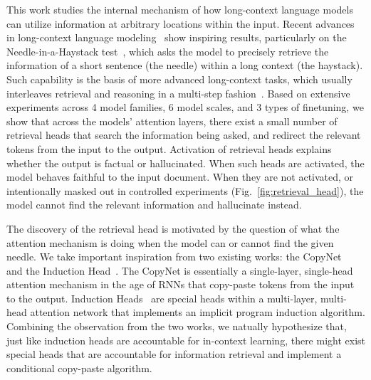 This work studies the internal mechanism of how long-context language models can utilize information at arbitrary locations within the input. 
Recent advances in long-context language modeling~\citep{claude, reid2024gemini, fu2024data} show inspiring results, particularly on the Needle-in-a-Haystack test~\citep{needleinhaystack}, which asks the model to precisely retrieve the information of a short sentence (the needle) within a long context (the haystack). 
Such capability is the basis of more advanced long-context tasks, which usually interleaves retrieval and reasoning in a multi-step fashion~\citep{kuratov2024search}. 
Based on extensive experiments across 4 model families, 6 model scales, and 3  types of finetuning,
we show that across the models' attention layers, there exist a small number of retrieval heads that search the information being asked, and redirect the relevant tokens from the input to the output. 
Activation of retrieval heads explains whether the output is factual or hallucinated. 
When such heads are activated, the model behaves faithful to the input document.
When they are not activated, or intentionally masked out in controlled experiments (Fig.~\ref{fig:retrieval_head}), the model cannot find the relevant information and hallucinate instead. 




The discovery of the retrieval head is motivated by the question of what the attention mechanism is doing when the model can or cannot find the given needle.
We take important inspiration from two existing works: the CopyNet~\citep{gu-etal-2016-incorporating} and the Induction Head~\citep{olsson2022context}.
The CopyNet is essentially a single-layer, single-head attention mechanism in the age of RNNs that copy-paste tokens from the input to the output.
Induction Heads~\citep{olsson2022context} are special heads within a multi-layer, multi-head attention network that implements an implicit program induction algorithm.
Combining the observation from the two works, we natually hypothesize that, just like induction heads are accountable for in-context learning, there might exist special heads that are accountable for information retrieval and implement a conditional copy-paste algorithm.

